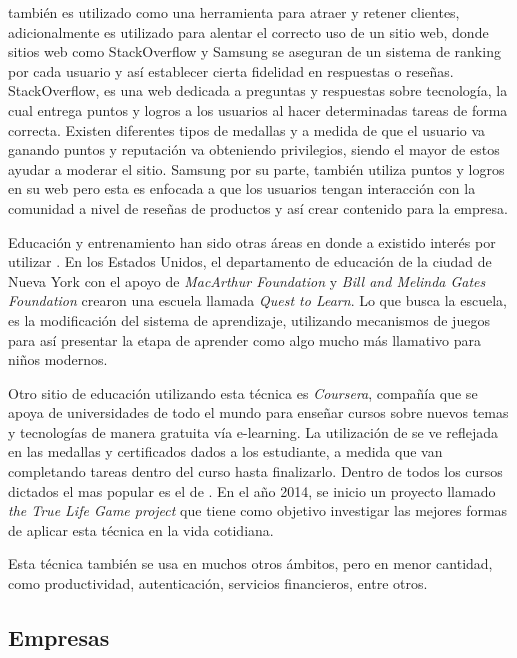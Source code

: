{\GAM} también es utilizado como una herramienta para atraer y retener clientes,
adicionalmente es utilizado para alentar el correcto uso de un sitio web,
donde sitios web como StackOverflow y Samsung se aseguran de un sistema
de ranking por cada usuario y así establecer cierta fidelidad en respuestas
o reseñas.
StackOverflow, es una web dedicada a preguntas y respuestas sobre tecnología,
la cual entrega puntos  y logros a los usuarios al hacer determinadas tareas
de forma correcta.
Existen diferentes tipos de medallas y a medida  de que el usuario va ganando
puntos y reputación va obteniendo privilegios, siendo el mayor de estos ayudar a
moderar el sitio.
Samsung por su parte, también utiliza puntos y logros en su web pero esta
es enfocada a que los usuarios tengan interacción con la comunidad a nivel de
reseñas de productos y así crear contenido para la empresa\cite{Gam:Util:3}.

Educación y entrenamiento han sido otras áreas en donde a existido interés por
utilizar {\GAM}.
En los Estados Unidos, el departamento de educación de la ciudad de Nueva York
con el apoyo de \emph{MacArthur Foundation} y \emph{Bill and Melinda Gates
Foundation} crearon una escuela  llamada \emph{Quest to Learn}.
Lo que busca la escuela, es la modificación del sistema de aprendizaje,
utilizando mecanismos de juegos para así presentar la etapa de aprender
como algo mucho más llamativo para niños modernos\cite{Gam:Util:4}.

Otro sitio de educación utilizando esta técnica es \emph{Coursera},
compañía que se apoya de universidades de todo el mundo para enseñar
cursos sobre nuevos temas y tecnologías de manera gratuita vía e-learning.
La utilización de {\GAM} se ve reflejada en las medallas y certificados dados
a los estudiante, a medida que van completando tareas dentro del curso
hasta finalizarlo.
Dentro de todos los cursos dictados el mas popular es el de {\GAM}\cite{Gam:Util:5}.
En el año 2014, se inicio un proyecto llamado \emph{the True Life Game project}
que tiene como objetivo investigar las mejores formas de aplicar esta técnica en
la vida cotidiana.

Esta técnica también se usa en muchos otros ámbitos, pero en menor cantidad,
como productividad, autenticación, servicios financieros, entre otros.

\subsection{Empresas}

